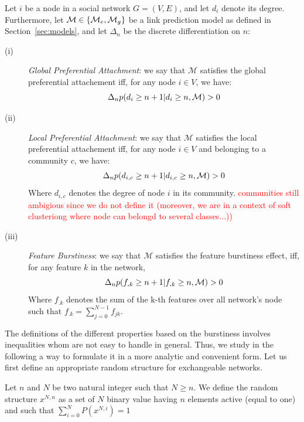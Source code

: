 \begin{definition}
Let $i$ be a node in a social network $G=(V,E)$, and let $d_i$ denote its degree. Furthermore, let $\mathcal{M} \in \{\mathcal{M}_e, \mathcal{M}_g\}$ be a link prediction model as defined in Section~\ref{sec:models}, and let $\Delta_n$ be the discrete differentiation on $n$: 
\begin{description}
\item[(i)] \emph{Global Preferential Attachment}: we say that $\mathcal{M}$ satisfies the global preferential attachement iff, for any node $i \in V$, we have:
 \begin{equation}
 \Delta_n p(d_i \geq n+1 | d_i \geq n,  \mathcal{M}) > 0
 \end{equation}
\item[(ii)] \emph{Local Preferential Attachment}: we say that $\mathcal{M}$ satisfies the local preferential attachement iff, for any node $i \in V$ and belonging to a community  $c$, we have:
  \begin{equation}
 \Delta_n p(d_{i,c} \geq n+1 | d_{i,c} \geq n,  \mathcal{M}) > 0
 \end{equation}
  Where $d_{i,c}$ denotes the degree of node $i$ in its community. \textcolor{red}{communities still ambigious since we do not define it (moreover, we are in a context of soft clusteriong where node can belongd to several classes...)) }
\item[(iii)] \emph{Feature Burstiness}: we say that $\mathcal{M}$ satisfies the feature burstiness effect, iff, for any feature $k$ in the network,   
  \begin{equation}
	\Delta_n p(f_{\bm{.}k} \geq n+1 | f_{\bm{.}k} \geq n,  \mathcal{M}) > 0
  \end{equation}
   Where $f_{\bm{.}k}$ denotes the sum of the k-th features over all network's node such that $f_{\bm{.}k} = \sum_{j=0}^{N-1} f_{jk}$.
\end{description}
\label{def:burst-soc-net}
\end{definition}
%
The definitions of the different properties based on the burstiness involves inequalities whom are not easy to handle in general. Thus, we study in the following a way to formulate it in a more analytic and convenient form. Let us first define an appropriate random structure for exchangeable networks.

\begin{definition}
	Let $n$ and $N$ be two natural integer such that $N \geq n$. We define the random structure $x^{N,n}$ as a set of $N$ binary value having $n$ elements active (equal to one) and such that $\sum_{i=0}^N P(x^{N,i}) = 1$
	\label{def:rd_struct}
\end{definition}

